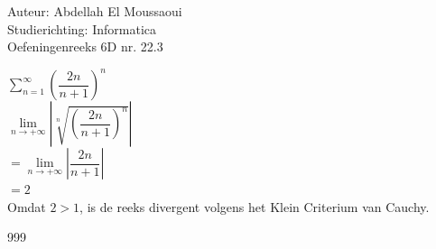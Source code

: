 \documentclass[a4paper]{article}
\begin{document}
  
\noindent \large Auteur: Abdellah El Moussaoui \\
\noindent \large Studierichting: Informatica\\
\noindent \large Oefeningenreeks 6D nr. 22.3\\

\medskip

\normalsize


$\displaystyle\sum_{n=1}^{\infty}\left(\dfrac{2n}{n+1}\right)^n$\\

$ \lim\limits_{n\to+\infty} \left| \sqrt[n]{\left(\dfrac{2n}{n+1}\right)^n} \right| $\\

$ = \lim\limits_{n\to+\infty} \left|\dfrac{2n}{n+1} \right| $\\

$= 2 $\\

Omdat $2 > 1$, is de reeks divergent volgens het Klein Criterium van Cauchy.\\


\begin{thebibliography}{999}
\end{thebibliography}
\end{document}
